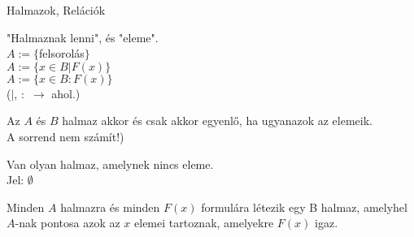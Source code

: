 

\begin{frame}[plain]
\begin{tcolorbox}[center, colback={myyellow}, coltext={black}, colframe={myyellow}]
    {\RHuge Halmazok, Relációk}
    \mmedskip
\end{tcolorbox}
\end{frame}

\begin{frame}
  \begin{tcolorbox}[title={Def.: A halmazelmélet "Definiálatlan alapfogalmai"}]
    "Halmaznak lenni", és "eleme".\\
    $A := \{$felsorolás$\}$\\
    $A := \{ x \in B | F(x) \}$\\
    $A := \{ x \in B : F(x) \}$\\
    {\footnotesize ($|$, $:$ $\rightarrow$ ahol.)}
  \end{tcolorbox}

  \begin{tcolorbox}[title={Def.:  Meghatározottsági Axióma (Halmazok egyenlősége)}]
    Az $A$ és $B$ halmaz akkor és csak akkor egyenlő, ha ugyanazok az elemeik.\\
    {\footnotesize A sorrend nem számít!)}
  \end{tcolorbox}

  \begin{tcolorbox}[title={Def.: Az üres halaz axiómája}]
    Van olyan halmaz, amelynek nincs eleme.\\
    Jel: $\emptyset$
  \end{tcolorbox}

  \begin{tcolorbox}[title={Def.: Részhalmaz-axióma}]
    Minden $A$ halmazra és minden $F(x)$ formulára létezik egy B halmaz, amelyhel $A$-nak pontosa azok az $x$ elemei tartoznak, amelyekre $F(x)$ igaz.
  \end{tcolorbox}
\end{frame}

